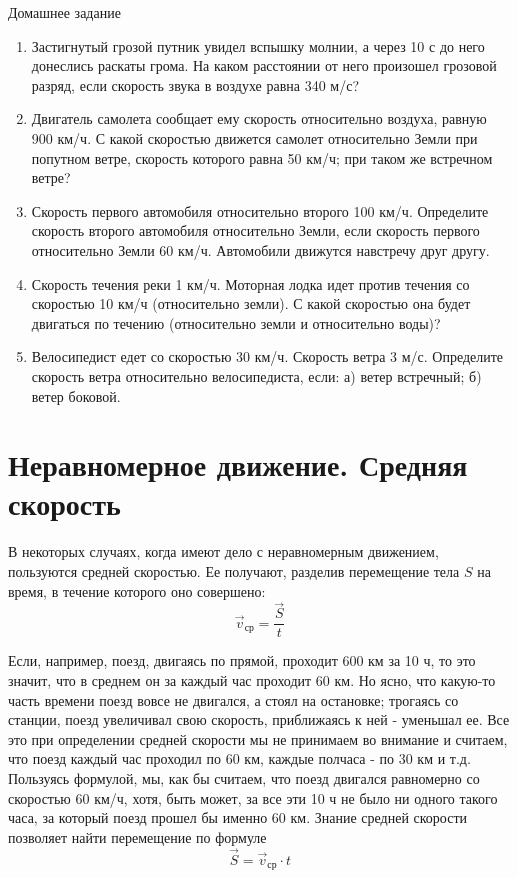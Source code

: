 \documentclass[a6paper, 11pt]{diss_4}
\renewcommand{\'}{\,'}
\begin{document}
\begin{center}
   Домашнее задание
\end{center}
\begin{enumerate}
\item Застигнутый грозой путник увидел вспышку молнии, а через 10 с до него донеслись раскаты грома. На каком расстоянии от него произошел грозовой разряд, если скорость звука в воздухе равна 340 м/с?
\item Двигатель самолета сообщает ему скорость относительно воздуха, равную 900 км/ч. С какой скоростью движется самолет относительно Земли при попутном ветре, скорость которого равна 50 км/ч; при таком же встречном ветре?
\item Скорость первого автомобиля относительно второго 100 км/ч. Определите скорость второго автомобиля относительно Земли, если скорость первого относительно Земли 60 км/ч. Автомобили движутся навстречу друг другу.
\item Скорость течения реки 1 км/ч. Моторная лодка идет против течения со скоростью 10 км/ч (относительно земли). С какой скоростью она будет двигаться по течению (относительно земли и относительно воды)?
\item Велосипедист едет со скоростью 30 км/ч. Скорость ветра 3 м/с. Определите скорость ветра относительно велосипедиста, если: а) ветер встречный; б) ветер боковой.
\end{enumerate}


\section{Неравномерное движение. Средняя скорость}

 В некоторых случаях, когда имеют дело с неравномерным движением, пользуются
средней скоростью. Ее получают, разделив перемещение тела $S$ на время, в течение
которого оно совершено:
\[\vec{v}_{ср}=\frac{\vec{S}}{t}\]

 Если, например, поезд, двигаясь по прямой, проходит 600 км за 10 ч, то это
значит, что в среднем он за каждый час проходит 60 км. Но ясно, что какую-то
часть времени поезд вовсе не двигался, а стоял на остановке; трогаясь со
станции, поезд увеличивал свою скорость, приближаясь к ней - уменьшал ее. Все
это при определении средней скорости мы не принимаем во внимание и считаем, что
поезд каждый час проходил по 60 км, каждые полчаса - по 30 км и т.д. Пользуясь
формулой, мы, как бы считаем, что поезд двигался равномерно со скоростью 60
км/ч, хотя, быть может, за все эти 10 ч не было ни одного такого часа, за
который поезд прошел бы именно 60 км. Знание средней скорости позволяет найти
перемещение по формуле
\[\vec{S}=\vec{v}_{ср}\cdot t\]
\end{document}
